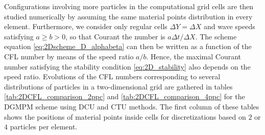 Configurations involving more particles in the computational grid cells are then studied numerically by assuming the same material points distribution in every element.
Furthermore, we consider only regular cells $\Delta Y = \Delta X$ and wave speeds satisfying $a\geq b >0$, so that Courant the number is $a\Delta t/\Delta X$.
The scheme equation \eqref{eq:2Dscheme_D_alphabeta} can then be written as a function of the CFL number by means of the speed ratio  $a/b$.
Hence, the maximal Courant number satisfying the stability condition \eqref{eq:2D_stability} also depends on the speed ratio.
Evolutions of the CFL numbers corresponding to several distributions of particles in a two-dimensional grid are gathered in tables \ref{tab:2DCFL_comparison_2ppc} and \ref{tab:2DCFL_comparison_4ppc} for the DGMPM scheme using DCU and CTU methods.
The first column of these tables shows the positions of material points inside cells for discretizations based on $2$ or $4$ particles per element. 

